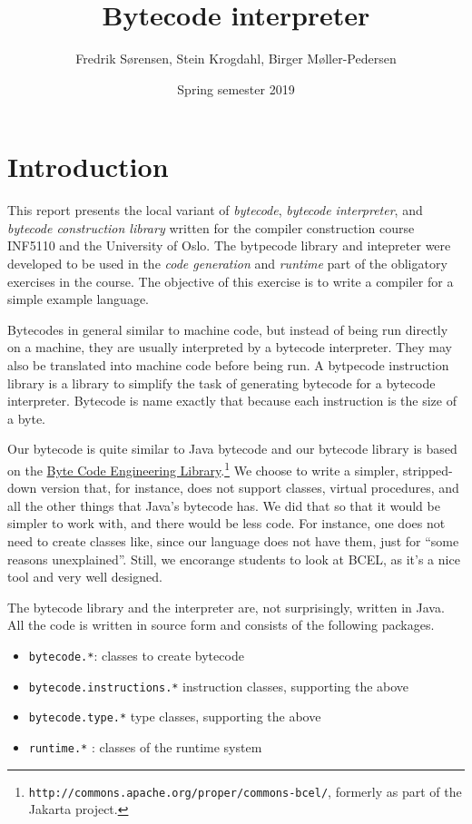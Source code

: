 \documentclass[11pt]{article}
\author{Fredrik Sørensen, Stein Krogdahl, Birger Møller-Pedersen}
\date{Spring semester 2019}
\title{Bytecode interpreter}
\begin{document}
\maketitle
\tableofcontents


\section{Introduction}
\label{sec:org9eb8a76}

This report presents the local variant of \emph{bytecode}, \emph{bytecode
interpreter}, and \emph{bytecode construction library} written for the compiler
construction course INF5110 and the University of Oslo. The bytpecode
library and intepreter were developed to be used in the \emph{code generation}
and \emph{runtime} part of the obligatory exercises in the course. The objective
of this exercise is to write a compiler for a simple example language.


Bytecodes in general similar to machine code, but instead of being run
directly on a machine, they are usually interpreted by a bytecode
interpreter. They may also be translated into machine code before being
run. A bytpecode instruction library is a library to simplify the task of
generating bytecode for a bytecode interpreter. Bytecode is name exactly
that because each instruction is the size of a byte.

Our bytecode is quite similar to Java bytecode and our bytecode library is
based on the \href{http://commons.apache.org/proper/commons-bcel/}{Byte Code Engineering Library}.\footnote{\texttt{http://commons.apache.org/proper/commons-bcel/}, formerly as
part of the Jakarta project.} We choose to write a
simpler, stripped-down version that, for instance, does not support
classes, virtual procedures, and all the other things that Java's bytecode
has. We did that so that it would be simpler to work with, and there would
be less code. For instance, one does not need to create classes like, since
our language does not have them, just for ``some reasons
unexplained''. Still, we encorange students to look at BCEL, as it's a nice
tool and very well designed.




The bytecode library and the interpreter are, not surprisingly, written in
Java. All the code is written in source form and consists of the following
packages.

\begin{itemize}
\item \texttt{bytecode.*}:    classes to create bytecode
\item \texttt{bytecode.instructions.*}  instruction classes, supporting the above
\item \texttt{bytecode.type.*}  type classes, supporting the above
\item \texttt{runtime.*} : classes of the runtime system
\end{itemize}
\end{document}
